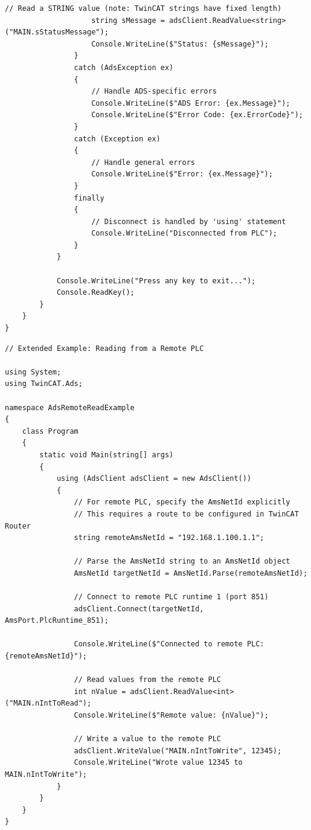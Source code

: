 \documentclass[11pt,a4paper]{article}
\begin{document}
\begin{lstlisting}[style=csharpstyle]
                    // Read a STRING value (note: TwinCAT strings have fixed length)
                    string sMessage = adsClient.ReadValue<string>("MAIN.sStatusMessage");
                    Console.WriteLine($"Status: {sMessage}");
                }
                catch (AdsException ex)
                {
                    // Handle ADS-specific errors
                    Console.WriteLine($"ADS Error: {ex.Message}");
                    Console.WriteLine($"Error Code: {ex.ErrorCode}");
                }
                catch (Exception ex)
                {
                    // Handle general errors
                    Console.WriteLine($"Error: {ex.Message}");
                }
                finally
                {
                    // Disconnect is handled by 'using' statement
                    Console.WriteLine("Disconnected from PLC");
                }
            }
            
            Console.WriteLine("Press any key to exit...");
            Console.ReadKey();
        }
    }
}
\end{lstlisting}

\begin{lstlisting}[style=csharpstyle]
// Extended Example: Reading from a Remote PLC

using System;
using TwinCAT.Ads;

namespace AdsRemoteReadExample
{
    class Program
    {
        static void Main(string[] args)
        {
            using (AdsClient adsClient = new AdsClient())
            {
                // For remote PLC, specify the AmsNetId explicitly
                // This requires a route to be configured in TwinCAT Router
                string remoteAmsNetId = "192.168.1.100.1.1";
                
                // Parse the AmsNetId string to an AmsNetId object
                AmsNetId targetNetId = AmsNetId.Parse(remoteAmsNetId);
                
                // Connect to remote PLC runtime 1 (port 851)
                adsClient.Connect(targetNetId, AmsPort.PlcRuntime_851);
                
                Console.WriteLine($"Connected to remote PLC: {remoteAmsNetId}");
                
                // Read values from the remote PLC
                int nValue = adsClient.ReadValue<int>("MAIN.nIntToRead");
                Console.WriteLine($"Remote value: {nValue}");
                
                // Write a value to the remote PLC
                adsClient.WriteValue("MAIN.nIntToWrite", 12345);
                Console.WriteLine("Wrote value 12345 to MAIN.nIntToWrite");
            }
        }
    }
}
\end{lstlisting}
\end{document}
